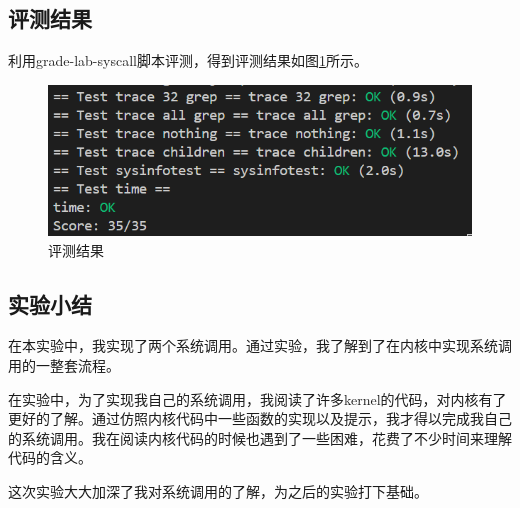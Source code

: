 \subsection{评测结果}
利用grade-lab-syscall脚本评测，得到评测结果如图\ref{fig:syscall}所示。
\begin{figure}[h]
    \centering
    \includegraphics[width=\linewidth]{pics/syscall评测结果.png}
    \caption{评测结果}
    \label{fig:syscall}
\end{figure}

\subsection{实验小结}

在本实验中，我实现了两个系统调用。通过实验，我了解到了在内核中实现系统调用的一整套流程。

在实验中，为了实现我自己的系统调用，我阅读了许多kernel的代码，对内核有了更好的了解。通过仿照内核代码中一些函数的实现以及提示，我才得以完成我自己的系统调用。我在阅读内核代码的时候也遇到了一些困难，花费了不少时间来理解代码的含义。

这次实验大大加深了我对系统调用的了解，为之后的实验打下基础。
